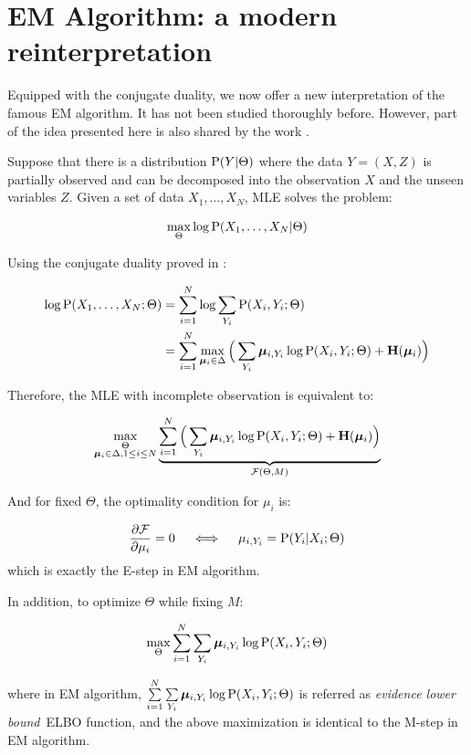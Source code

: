 \section{EM Algorithm: a modern reinterpretation} \label{sec::bg-em}

Equipped with the conjugate duality, we now offer a new interpretation of the
famous EM algorithm. It has not been studied thoroughly before. However, part of
the idea presented here is also shared by the work \cite{iusem1992primal}.

Suppose that there is a distribution $\P(Y | \Theta)$ where the data $Y = (X,
Z)$ is partially observed and can be decomposed into the observation $X$ and the
unseen variables $Z$. Given a set of data $X_1, \dots, X_N$, MLE solves the
problem:

$$ \max_\Theta \log \P(X_1, \dots, X_N | \Theta) $$

Using the conjugate duality proved in :

\begin{align}
  \log \P(X_1, \dots, X_N ; \Theta) &=
\sum\limits_{i=1}^N \log \sum\limits_{Y_i} \P(X_i, Y_i ;\Theta)  \nonumber \\
&=
 \sum\limits_{i=1}^N \max_{\vmu_i \in \Delta} \Big(
  \sum\limits_{Y_i} \vmu_{i, Y_i} \log \P(X_i, Y_i ;\Theta) +
  \entropy(\vmu_i) \Big) \label{eq::em-conjugate}
\end{align}

Therefore, the MLE with incomplete observation is equivalent to:

$$
\max\limits_{\substack{\Theta \\ \vmu_i \in \Delta , 1 \leq i \leq N}}
\underbrace{\sum\limits_{i=1}^N  \Big(
  \sum\limits_{Y_i} \vmu_{i, Y_i} \log \P(X_i, Y_i ;\Theta) +
\entropy(\vmu_i) \Big)}_{\mathcal{F}(\Theta, M)} \nonumber
$$

And for fixed $\Theta$, the optimality condition for $\mu_i$ is:

$$
\frac{\partial \mathcal{F}}{\partial \mu_i} = 0
\quad\iff\quad
\mu_{i, Y_i} = \P(Y_i | X_i; \Theta)
$$
which is exactly the E-step in EM algorithm.

In addition, to optimize $\Theta$ while fixing $M$:

$$
\max\limits_{\Theta}
\sum\limits_{i=1}^N \sum\limits_{Y_i} \vmu_{i, Y_i} \log \P(X_i, Y_i ;\Theta)
$$

where in EM algorithm, $\sum\limits_{i=1}^N \sum\limits_{Y_i} \vmu_{i, Y_i} \log
\P(X_i, Y_i ;\Theta)$ is referred as \emph{evidence lower bound}~ELBO function,
and the above maximization is identical to the M-step in EM algorithm.

